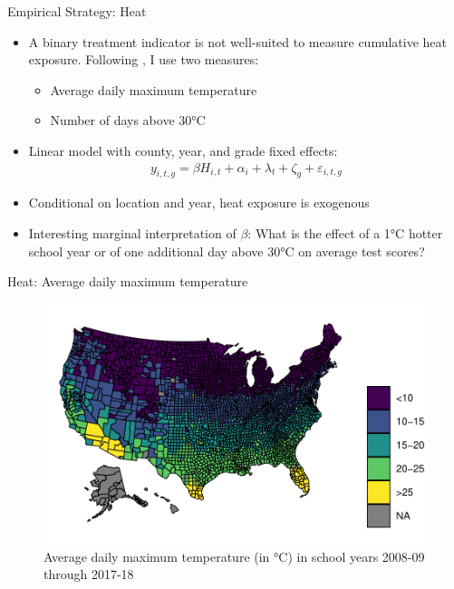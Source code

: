 \documentclass[hyperref={colorlinks = true,linkcolor = blue, citecolor=blue,urlcolor=blue}]{beamer}
\begin{document}
\begin{frame}{Empirical Strategy: Heat}
	\begin{itemize}
		\item A binary treatment indicator is not well-suited to measure cumulative heat exposure. Following \cite{Goodman_2020}, I use two measures:
		\begin{itemize}
			\item Average daily maximum temperature
			\item Number of days above 30°C
		\end{itemize}
		\item Linear model with county, year, and grade fixed effects:
		\begin{align*}
			y_{i, t, g} = \beta H_{i, t} + \alpha_i + \lambda_t + \zeta_g + \varepsilon_{i, t, g}
		\end{align*}
		\item Conditional on location and year, heat exposure is exogenous
		\item Interesting marginal interpretation of $\beta$: What is the effect of a 1°C hotter school year or of one additional	day above 30°C on average test scores?
	\end{itemize}
\end{frame}

\begin{frame}{Heat: Average daily maximum temperature}
	\begin{figure}[!h]
		\centering
		\includegraphics[scale=0.65]{"../Code & Data/HeatMapTemp.pdf"}
		\caption{Average daily maximum temperature (in °C) in school years 2008-09 through 2017-18}
		\label{HeatMapTemp}
	\end{figure}
\end{frame}
\end{document}
